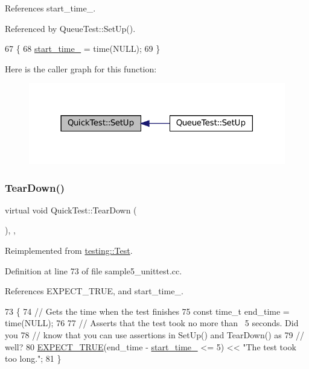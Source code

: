 References start\+\_\+time\+\_\+.



Referenced by Queue\+Test\+::\+Set\+Up().


\begin{DoxyCode}
67                        \{
68     \hyperlink{classQuickTest_aba6a28bbd733e72e3b088a0b66386809}{start\_time\_} = time(NULL);
69   \}
\end{DoxyCode}
Here is the caller graph for this function\+:
\nopagebreak
\begin{figure}[H]
\begin{center}
\leavevmode
\includegraphics[width=318pt]{classQuickTest_ae52ad082887512b92240ce40a1a05650_icgraph}
\end{center}
\end{figure}
\mbox{\label{classQuickTest_a6b2d16cc0c69d30a16fe612db5abfc39}} 
\subsubsection{\texorpdfstring{Tear\+Down()}{TearDown()}}
{\footnotesize\ttfamily virtual void Quick\+Test\+::\+Tear\+Down (\begin{DoxyParamCaption}{ }\end{DoxyParamCaption})\hspace{0.3cm}{\ttfamily [inline]}, {\ttfamily [protected]}, {\ttfamily [virtual]}}



Reimplemented from \hyperlink{classtesting_1_1Test_a2889fd829b6c712d98fb3896d28f64a3}{testing\+::\+Test}.



Definition at line 73 of file sample5\+\_\+unittest.\+cc.



References E\+X\+P\+E\+C\+T\+\_\+\+T\+R\+UE, and start\+\_\+time\+\_\+.


\begin{DoxyCode}
73                           \{
74     \textcolor{comment}{// Gets the time when the test finishes}
75     \textcolor{keyword}{const} time\_t end\_time = time(NULL);
76 
77     \textcolor{comment}{// Asserts that the test took no more than ~5 seconds.  Did you}
78     \textcolor{comment}{// know that you can use assertions in SetUp() and TearDown() as}
79     \textcolor{comment}{// well?}
80     \hyperlink{gtest_8h_ac33e7cdfb5d44a7a0f0ab552eb5c3c6a}{EXPECT\_TRUE}(end\_time - \hyperlink{classQuickTest_aba6a28bbd733e72e3b088a0b66386809}{start\_time\_} <= 5) << \textcolor{stringliteral}{"The test took too long."};
81   \}
\end{DoxyCode}


